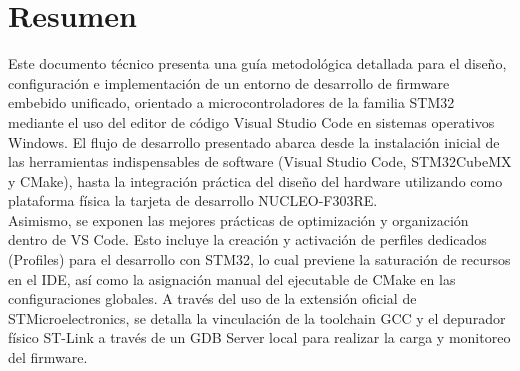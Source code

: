 \documentclass[
10pt, %
a4paper, %
oneside, %
headinclude,footinclude, %
BCOR5mm, %
]{scrartcl}
\begin{document}
\setcounter{tocdepth}{3} %

\section*{Resumen}
Este documento técnico presenta una guía metodológica detallada para el diseño, configuración e implementación de un entorno de desarrollo de firmware embebido unificado, orientado a microcontroladores de la familia STM32 mediante el uso del editor de código Visual Studio Code en sistemas operativos Windows. El flujo de desarrollo presentado abarca desde la instalación inicial de las herramientas indispensables de software (Visual Studio Code, STM32CubeMX y CMake), hasta la integración práctica del diseño del hardware utilizando como plataforma física la tarjeta de desarrollo NUCLEO-F303RE.\\

Asimismo, se exponen las mejores prácticas de optimización y organización dentro de VS Code. Esto incluye la creación y activación de perfiles dedicados (Profiles) para el desarrollo con STM32, lo cual previene la saturación de recursos en el IDE, así como la asignación manual del ejecutable de CMake en las configuraciones globales. A través del uso de la extensión oficial de STMicroelectronics, se detalla la vinculación de la toolchain GCC y el depurador físico ST-Link a través de un GDB Server local para realizar la carga y monitoreo del firmware.
\newpage %

\tableofcontents %




\newpage
\end{document}
